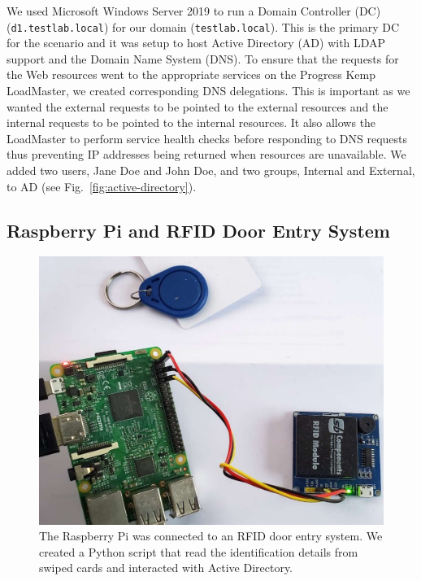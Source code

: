 We used Microsoft Windows Server 2019 to run a Domain Controller (DC)
(\texttt{d1.testlab.local}) for our domain (\texttt{testlab.local}).
This is the primary DC for the scenario and it was setup to host
Active Directory (AD) with LDAP support and the Domain Name System
(DNS).  To ensure that the requests for the Web resources went to the
appropriate services on the Progress Kemp LoadMaster, we created
corresponding DNS delegations.  This is important as we wanted the
external requests to be pointed to the external resources and the
internal requests to be pointed to the internal resources.  It also
allows the LoadMaster to perform service health checks before
responding to DNS requests thus preventing IP addresses being returned
when resources are unavailable.  We added two users, Jane Doe and John
Doe, and two groups, Internal and External, to AD (see
Fig.~\ref{fig:active-directory}).

\subsection{Raspberry Pi and RFID Door Entry System}

\begin{figure}
  \centerline{\includegraphics[width=\columnwidth]{img/raspberry-pi-rfid}}
  \caption{The Raspberry Pi was connected to an RFID door entry
    system.  We created a Python script that read the identification
    details from swiped cards and interacted with Active
    Directory.}\label{fig:raspberry-pi-rfid}
\end{figure}

